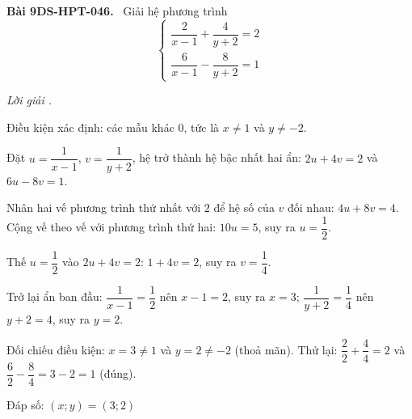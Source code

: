 \documentclass[12pt,a4paper]{article}
\newenvironment{problem}[1][]{\par\medskip\noindent\textbf{Bài #1.}\ }{\par}
\newenvironment{solution}[1][]{\par\noindent\textit{Lời giải #1.}\par}{\par}
\begin{document}
\begin{problem}[9DS-HPT-046]
Giải hệ phương trình
\[ \begin{cases} \dfrac{2}{x - 1} + \dfrac{4}{y + 2} = 2 \\ \dfrac{6}{x - 1} - \dfrac{8}{y + 2} = 1 \end{cases} \]

\begin{solution}
Điều kiện xác định: các mẫu khác $0$, tức là $x \neq 1$ và $y \neq -2$.

Đặt $u = \dfrac{1}{x - 1}$, $v = \dfrac{1}{y + 2}$, hệ trở thành hệ bậc nhất hai ẩn: $2u + 4v = 2$ và $6u - 8v = 1$.

Nhân hai vế phương trình thứ nhất với $2$ để hệ số của $v$ đối nhau: $4u + 8v = 4$. Cộng vế theo vế với phương trình thứ hai: $10u = 5$, suy ra $u = \dfrac{1}{2}$.

Thế $u = \dfrac{1}{2}$ vào $2u + 4v = 2$: $1 + 4v = 2$, suy ra $v = \dfrac{1}{4}$.

Trở lại ẩn ban đầu: $\dfrac{1}{x - 1} = \dfrac{1}{2}$ nên $x - 1 = 2$, suy ra $x = 3$; $\dfrac{1}{y + 2} = \dfrac{1}{4}$ nên $y + 2 = 4$, suy ra $y = 2$.

Đối chiếu điều kiện: $x = 3 \neq 1$ và $y = 2 \neq -2$ (thoả mãn). Thử lại: $\dfrac{2}{2} + \dfrac{4}{4} = 2$ và $\dfrac{6}{2} - \dfrac{8}{4} = 3 - 2 = 1$ (đúng).

Đáp số: $\boxed{(x; y) = (3; 2)}$
\end{solution}
\end{problem}
\end{document}
